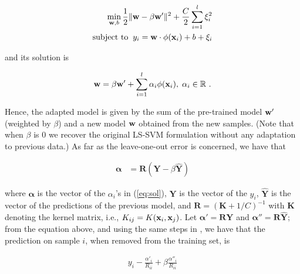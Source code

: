 \begin{align} 
  \min_{\mathbf{w},b} \frac{1}{2} \|\mathbf{w}- \beta \mathbf{w}'\|^2 + \frac{C}{2} \sum_{i=1}^l \xi_i^2 \nonumber \\
  \mbox{subject to} \;\; y_i = \mathbf{w} \cdot \phi(\mathbf{x}_i) + b + \xi_i
  \label{eq:opt_prob}
\end{align}

\noindent and its solution is

\begin{equation}
  \mathbf{w} = \beta \mathbf{w}' + \sum_{i=1}^l \alpha_i \phi(\mathbf{x}_i), \; \alpha_i \in \mathbb{R}~.
  \label{eq:sol}
\end{equation}

Hence, the adapted model is given by the sum of the pre-trained model
$\mathbf{w}'$ (weighted by $\beta$) and a new model $\mathbf{w}$ obtained from the new samples.
(Note that when $\beta$ is $0$ we recover the original LS-SVM
formulation without any adaptation to previous data.)
As far as the leave-one-out error is concerned,
we have that

\begin{align}
   \boldsymbol{\alpha}&=\boldsymbol{R} (\boldsymbol{Y}-\beta \hat{\boldsymbol{Y}})
\end{align}

\noindent where
$\boldsymbol{\alpha}$ is the vector of the $\alpha_i$'s in (\ref{eq:sol}),
$\boldsymbol{Y}$ is the vector of the $y_i$,
$\hat{\boldsymbol{Y}}$ is the vector of the predictions of the previous model, and
$\boldsymbol{R}=(\boldsymbol{K}+1/C)^{-1}$ with
$\boldsymbol{K}$ denoting the kernel matrix, i.e., $K_{ij}=K(\mathbf{x}_i,\mathbf{x}_j)$.
Let $\boldsymbol{\alpha}'=\boldsymbol{R}\boldsymbol{Y}$ and
$\boldsymbol{\alpha}''=\boldsymbol{R}\hat{\boldsymbol{Y}}$; from the equation above,
and using the same steps in \cite{Cawley06}, we have that the
prediction on sample $i$, when removed from the training set, is

\begin{align}
	y_i - \frac{\alpha'_i}{R_{ii}} + \beta \frac{\alpha''_i}{R_{ii}}
\end{align}


